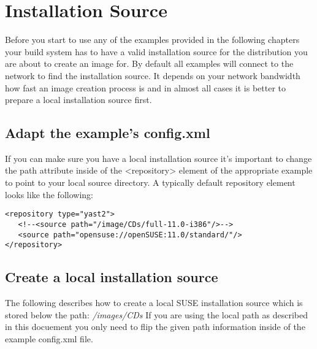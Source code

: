 \chapter{Installation Source}
\label{chapter:instsourcesetup}
\minitoc

Before you start to use any of the examples provided in the following
chapters your build system has to have a valid installation source for
the distribution you are about to create an image for.
By default all examples will connect to the network to find the
installation source. It depends on your network bandwidth how fast
an image creation process is and in almost all cases it is better
to prepare a local installation source first.

\section{Adapt the example's config.xml}
If you can make
sure you have a local installation source it's important to change
the path attribute inside of the <repository> element of the
appropriate example to point to your local source directory.
A typically default repository element looks like the following:

\begin{verbatim}
<repository type="yast2">
   <!--<source path="/image/CDs/full-11.0-i386"/>-->
   <source path="opensuse://openSUSE:11.0/standard/"/>
</repository>
\end{verbatim}

\section{Create a local installation source}
The following describes how to create a local SUSE installation
source which is stored below the path: \textit{/images/CDs}
If you are using the local path as described in this docuement
you only need to flip the given path information inside of
the example config.xml file.

